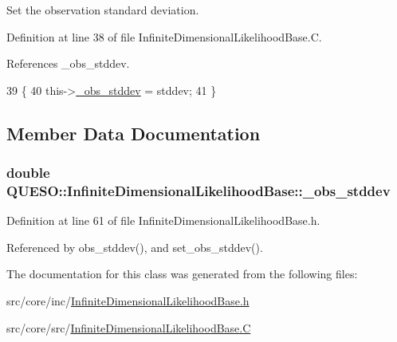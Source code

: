 Set the observation standard deviation. 



Definition at line 38 of file Infinite\-Dimensional\-Likelihood\-Base.\-C.



References \-\_\-obs\-\_\-stddev.


\begin{DoxyCode}
39 \{
40   this->\hyperlink{class_q_u_e_s_o_1_1_infinite_dimensional_likelihood_base_aa98ee3e521c8ab194c091f64257e7423}{\_obs\_stddev} = stddev;
41 \}
\end{DoxyCode}


\subsection{Member Data Documentation}
\hypertarget{class_q_u_e_s_o_1_1_infinite_dimensional_likelihood_base_aa98ee3e521c8ab194c091f64257e7423}{
\subsubsection[{\-\_\-obs\-\_\-stddev}]{\setlength{\rightskip}{0pt plus 5cm}double Q\-U\-E\-S\-O\-::\-Infinite\-Dimensional\-Likelihood\-Base\-::\-\_\-obs\-\_\-stddev\hspace{0.3cm}{\ttfamily [private]}}}\label{class_q_u_e_s_o_1_1_infinite_dimensional_likelihood_base_aa98ee3e521c8ab194c091f64257e7423}


Definition at line 61 of file Infinite\-Dimensional\-Likelihood\-Base.\-h.



Referenced by obs\-\_\-stddev(), and set\-\_\-obs\-\_\-stddev().



The documentation for this class was generated from the following files\-:\begin{DoxyCompactItemize}
\item 
src/core/inc/\hyperlink{_infinite_dimensional_likelihood_base_8h}{Infinite\-Dimensional\-Likelihood\-Base.\-h}\item 
src/core/src/\hyperlink{_infinite_dimensional_likelihood_base_8_c}{Infinite\-Dimensional\-Likelihood\-Base.\-C}\end{DoxyCompactItemize}
